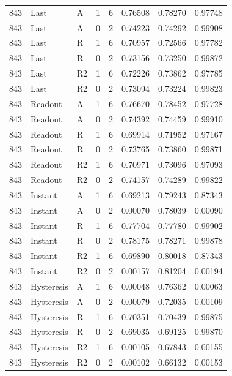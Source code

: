 \begin{longtable}{llllllll}
843 & Last & A & 1 & 6 & 0.76508 & 0.78270 & 0.97748 \\
843 & Last & A & 0 & 2 & 0.74223 & 0.74292 & 0.99908 \\
843 & Last & R & 1 & 6 & 0.70957 & 0.72566 & 0.97782 \\
843 & Last & R & 0 & 2 & 0.73156 & 0.73250 & 0.99872 \\
843 & Last & R2 & 1 & 6 & 0.72226 & 0.73862 & 0.97785 \\
843 & Last & R2 & 0 & 2 & 0.73094 & 0.73224 & 0.99823 \\
843 & Readout & A & 1 & 6 & 0.76670 & 0.78452 & 0.97728 \\
843 & Readout & A & 0 & 2 & 0.74392 & 0.74459 & 0.99910 \\
843 & Readout & R & 1 & 6 & 0.69914 & 0.71952 & 0.97167 \\
843 & Readout & R & 0 & 2 & 0.73765 & 0.73860 & 0.99871 \\
843 & Readout & R2 & 1 & 6 & 0.70971 & 0.73096 & 0.97093 \\
843 & Readout & R2 & 0 & 2 & 0.74157 & 0.74289 & 0.99822 \\
843 & Instant & A & 1 & 6 & 0.69213 & 0.79243 & 0.87343 \\
843 & Instant & A & 0 & 2 & 0.00070 & 0.78039 & 0.00090 \\
843 & Instant & R & 1 & 6 & 0.77704 & 0.77780 & 0.99902 \\
843 & Instant & R & 0 & 2 & 0.78175 & 0.78271 & 0.99878 \\
843 & Instant & R2 & 1 & 6 & 0.69890 & 0.80018 & 0.87343 \\
843 & Instant & R2 & 0 & 2 & 0.00157 & 0.81204 & 0.00194 \\
843 & Hysteresis & A & 1 & 6 & 0.00048 & 0.76362 & 0.00063 \\
843 & Hysteresis & A & 0 & 2 & 0.00079 & 0.72035 & 0.00109 \\
843 & Hysteresis & R & 1 & 6 & 0.70351 & 0.70439 & 0.99875 \\
843 & Hysteresis & R & 0 & 2 & 0.69035 & 0.69125 & 0.99870 \\
843 & Hysteresis & R2 & 1 & 6 & 0.00105 & 0.67843 & 0.00155 \\
843 & Hysteresis & R2 & 0 & 2 & 0.00102 & 0.66132 & 0.00153 \\
\bottomrule
\end{longtable}
